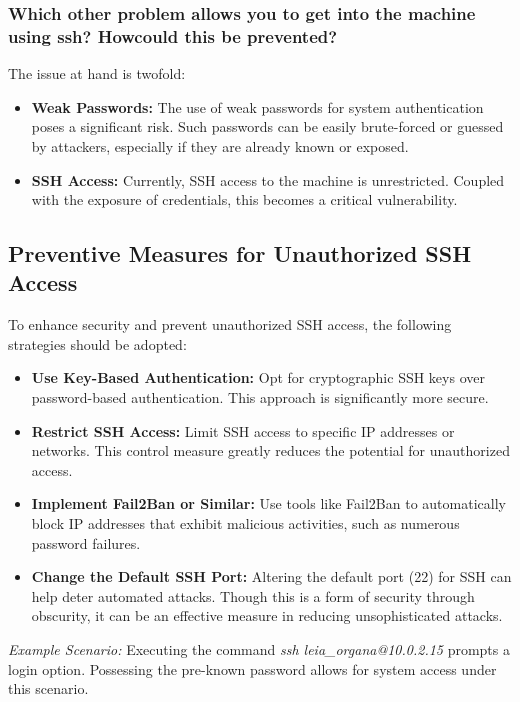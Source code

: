 \subsubsection{Which other problem allows you to get into the machine using ssh? Howcould this be prevented?}
The issue at hand is twofold:

\begin{itemize}
      \item \textbf{Weak Passwords:} The use of weak passwords for system authentication poses a significant risk. Such passwords can be easily brute-forced or guessed by attackers, especially if they are already known or exposed.

      \item \textbf{SSH Access:} Currently, SSH access to the machine is unrestricted. Coupled with the exposure of credentials, this becomes a critical vulnerability.
\end{itemize}

\subsection*{Preventive Measures for Unauthorized SSH Access}
To enhance security and prevent unauthorized SSH access, the following strategies should be adopted:

\begin{itemize}
      \item \textbf{Use Key-Based Authentication:} Opt for cryptographic SSH keys over password-based authentication. This approach is significantly more secure.

      \item \textbf{Restrict SSH Access:} Limit SSH access to specific IP addresses or networks. This control measure greatly reduces the potential for unauthorized access.

      \item \textbf{Implement Fail2Ban or Similar:} Use tools like Fail2Ban to automatically block IP addresses that exhibit malicious activities, such as numerous password failures.

      \item \textbf{Change the Default SSH Port:} Altering the default port (22) for SSH can help deter automated attacks. Though this is a form of security through obscurity, it can be an effective measure in reducing unsophisticated attacks.
\end{itemize}

\textit{Example Scenario:} Executing the command \textit{ssh leia\_organa@10.0.2.15} prompts a login option. Possessing the pre-known password allows for system access under this scenario.


